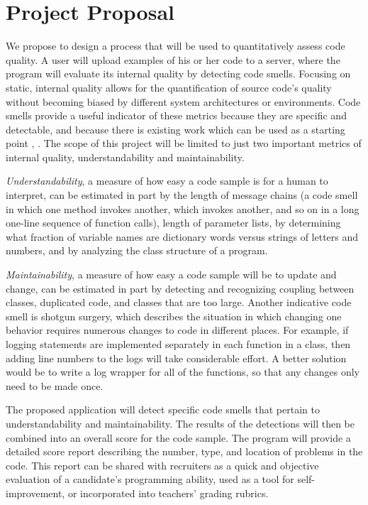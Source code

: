 \documentclass{sig-alternate}
\begin{document}
\section{Project Proposal}
\label{sec:project_proposal}
We propose to design a process that will be used to quantitatively assess code quality. A user will upload examples of his or her code to a server, where the program will evaluate its internal quality by detecting code smells. Focusing on static, internal quality allows for the quantification of source code's quality without becoming biased by different system architectures or environments. Code smells provide a useful indicator of these metrics because they are specific and detectable, and because there is existing work which can be used as a starting point \cite{moha2009duchien}, \cite{palomba}.  The scope of this project will be limited to just two important metrics of internal quality, understandability and maintainability. 
	
\emph{Understandability}, a measure of how easy a code sample is for a human to interpret, can be estimated in part by the length of message chains (a code smell in which one method invokes another, which invokes another, and so on in a long one-line sequence of function calls), length of parameter lists, by determining what fraction of variable names are dictionary words versus strings of letters and numbers, and by analyzing the class structure of a program. 

\emph{Maintainability}, a measure of how easy a code sample will be to update and change, can be estimated in part by detecting and recognizing coupling between classes, duplicated code, and classes that are too large. Another indicative code smell is shotgun surgery, which describes the situation in which changing one behavior requires numerous changes to code in different places. For example, if logging statements are implemented separately in each function in a class, then adding line numbers to the logs will take considerable effort. A better solution would be to write a log wrapper for all of the functions, so that any changes only need to be made once. 

The proposed application will detect specific code smells that pertain to understandability and maintainability. The results of the detections will then be combined into an overall score for the code sample. The program will provide a detailed score report describing the number, type, and location of problems in the code. This report can be shared with recruiters as a quick and objective evaluation of a candidate's programming ability, used as a tool for self-improvement, or incorporated into teachers' grading rubrics. 
\end{document}
